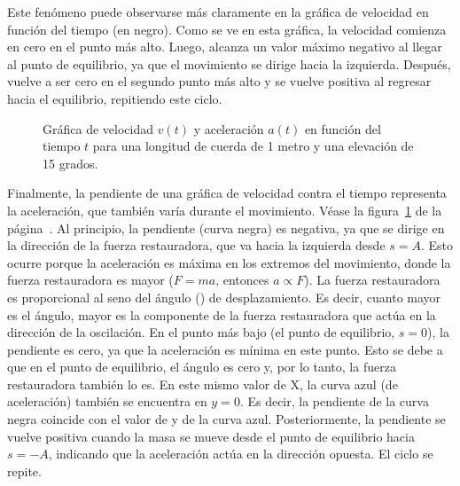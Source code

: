 \documentclass[letterpaper]{report}
\numberwithin{table}{section}
\begin{document}
Este fenómeno puede observarse más claramente en la gráfica de
velocidad en función del tiempo (en negro). Como se ve en esta
gráfica, la velocidad comienza en cero en el punto más alto. Luego,
alcanza un valor máximo negativo al llegar al punto de equilibrio, ya
que el movimiento se dirige hacia la izquierda. Después, vuelve a ser
cero en el segundo punto más alto y se vuelve positiva al regresar
hacia el equilibrio, repitiendo este ciclo.

\begin{figure}[ht]
  \centering
  \caption{Gráfica de velocidad $v(t)$ y aceleración $a(t)$ en
    función del tiempo $t$ para una
    longitud de cuerda de 1 metro y una elevación de 15
  grados.}\label{fig:velocidad_aceleración}
\end{figure}

Finalmente, la pendiente de una gráfica de velocidad contra el tiempo
representa la aceleración, que también varía durante el movimiento.
Véase la figura~\ref{fig:velocidad_aceleración} de la
página~\pageref{fig:velocidad_aceleración}.
Al principio, la pendiente (curva negra) es negativa, ya que se
dirige en la dirección de la fuerza restauradora, que va hacia la
izquierda desde $s=A$. Esto ocurre porque la aceleración es máxima en
los extremos del movimiento, donde la fuerza restauradora es mayor
($F=ma$, entonces $a \propto F$). La fuerza restauradora es proporcional al seno
del ángulo (\theta) de desplazamiento. Es decir, cuanto mayor es el
ángulo, mayor es la componente de la fuerza restauradora que actúa en
la dirección de la oscilación. En el punto más bajo (el punto de
equilibrio, $s=0$), la pendiente es cero, ya que la aceleración es
mínima en este punto. Esto se debe a que en el punto de equilibrio,
el ángulo es cero y, por lo tanto, la fuerza restauradora también lo
es. En este mismo valor de X, la curva azul (de aceleración) también
se encuentra en $y=0$. Es decir, la pendiente de la curva negra
coincide con el valor de y de la curva azul. Posteriormente, la
pendiente se vuelve positiva cuando la masa se mueve desde el punto
de equilibrio hacia $s=-A$, indicando que la aceleración actúa en la
dirección opuesta. El ciclo se repite.
\end{document}
